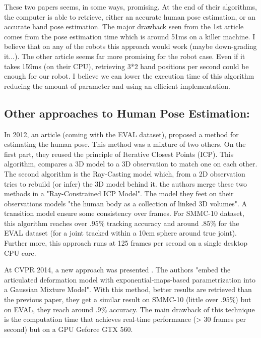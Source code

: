 \documentclass[a4paper]{article}
\begin{document}
			\begin{mdframed}[backgroundcolor = gray!30]
				These two papers seems, in some ways, promising. At the end of their algorithms, the computer is able to retrieve, either an accurate human pose estimation, or an accurate hand pose estimation. The major drawback seen from the 1st article comes from the pose estimation time which is around 51ms on a killer machine. I believe that on any of the robots this approach would work (maybe down-grading it...). The other article seems far more promising for the robot case. Even if it takes 159ms (on their CPU), retrieving 3*2 hand positions per second could be enough for our robot. I believe we can lower the execution time of this algorithm reducing the amount of parameter and using an efficient implementation\cite{jin2014efficient}.
			\end{mdframed}

		\subsection{Other approaches to Human Pose Estimation: }
		\label{sub:human-pose}
			In 2012, an article\cite{ganapathi2012real} (coming with the EVAL dataset), proposed a method for estimating the human pose. This method was a mixture of two others. On the first part, they reused the principle of Iterative Closest Points (ICP). This algorithm, compares a 3D model to a 3D observation to match one on each other. The second algorithm is the Ray-Casting model which, from a 2D observation tries to rebuild (or infer) the 3D model behind it. the authors merge these two methods in a "Ray-Constrained ICP Model". The model they feet on their observations models "the human body as a collection of linked 3D volumes". A transition model ensure some consistency over frames. For SMMC-10 dataset, this algorithm reaches over $.95\%$ tracking accuracy and around $.85\%$ for the EVAL dataset (for a joint tracked within a 10cm sphere around true joint). Further more, this approach runs at 125 frames per second on a single desktop CPU core.

			At CVPR 2014, a new approach was presented \cite{ye2014real}. The authors "embed the articulated deformation model with exponential-maps-based parametrization into a Gaussian Mixture Model". With this method, better results are retrieved than the previous paper, they get a similar result on SMMC-10 (little over $.95\%$) but on EVAL, they reach around $.9\%$ accuracy. The main drawback of this technique is the computation time that achieves real-time performance (> 30 frames per second) but on a GPU Geforce GTX 560.
\end{document}
